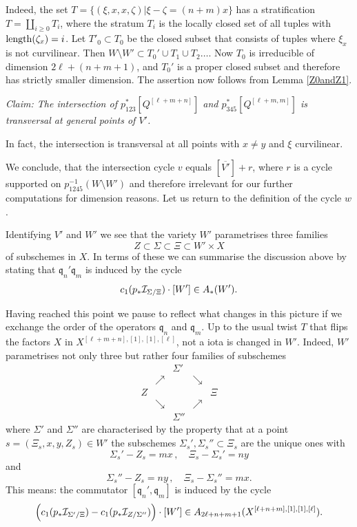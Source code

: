 \documentclass[twoside,11pt]{article}
\newcommand{\ki}{{\cal I}}
\newcommand{\gothq}{{\mathfrak q}}
\newcommand{\qq}{\gothq}
\newcommand{\length}{{\rm length}}
\begin{document}
Indeed, the set $T=\{(\xi,x,x,\zeta)|\xi-\zeta=(n+m)x\}$ has a stratification $T=\coprod_{i\geq0} T_i$, where the stratum $T_i$ is the locally closed
set of all tuples with $\length(\zeta_x)=i$. Let $T'_0\subset T_0$ be the 
closed subset that consists of tuples where $\xi_x$ is not curvilinear. Then
$W\setminus W'\subset T_0'\cup T_1\cup T_2\ldots$.
Now $T_0$ is irreducible of dimension $2\ell+(n+m+1)$, and $T_0'$ is a proper
closed subset and therefore has strictly smaller dimension. The assertion now
follows from Lemma \ref{Z0andZ1}.

{\em Claim: The intersection of $p_{123}^*[Q^{[\ell+m+n]}]$ and $p_{345}^*[Q^{[\ell+m,m]}]$ is transversal at general points of $V'$.}

In fact, the intersection is transversal at all points with $x\neq y$ and $\xi$ curvilinear.

We conclude, that the intersection cycle $v$ equals $[\overline{V'}]+r$, where
$r$ is a cycle supported on $p_{1245}^{-1}(W\setminus W')$ and therefore
irrelevant for our further computations for dimension reasons.
Let us return to the definition of the cycle $w$.

Identifying $V'$ and $W'$ we see that the variety $W'$ parametrises
three families
$$Z\subset \Sigma\subset \Xi\subset W'\times X$$
of subschemes in $X$. In terms of these we can summarise the discussion above
by stating that $\qq_n'\qq_m$ is induced by the cycle
$$c_1(p_*\ki_{\Sigma/\Xi})\cdot[W']\in A_*(W').$$

  
Having reached this point we pause to reflect what changes in this picture
if we exchange the order of the operators $\qq_n$ and $\qq_m$. Up to the
usual twist $T$ that flips the factors $X$ in $X^{[\ell+m+n],[1],[1],[\ell]}$, 
not a iota is changed in $W'$. Indeed, 
$W'$ parametrises not only three but rather four families of subschemes
$$\begin{array}{ccccc}
&&\Sigma'\\
&\nearrow&&\searrow\\
Z&&&&\Xi\\
&\searrow&&\nearrow\\
&&\Sigma''
\end{array}$$
where $\Sigma'$ and $\Sigma''$ are characterised by the property that at
a point $s=(\Xi_s,x,y,Z_s)\in W'$ the subschemes 
$\Sigma_s', \Sigma_s''\subset\Xi_s$ are the unique ones with 
$$\Sigma_s'-Z_s=mx\,,\quad \Xi_s-\Sigma_s'=ny$$
and 
$$\Sigma_s''-Z_s=ny\,,\quad \Xi_s-\Sigma_s''=mx.$$
This means: the commutator $[\qq_n',\qq_m]$ is induced by the cycle
$$\Big(c_1(p_*\ki_{\Sigma'/\Xi})-c_1(p_*\ki_{Z/\Sigma''})\Big)\cdot[W']
\in A_{2\ell+n+m+1}(X^{[\ell+n+m],[1],[1],[\ell]}).$$
\end{document}
